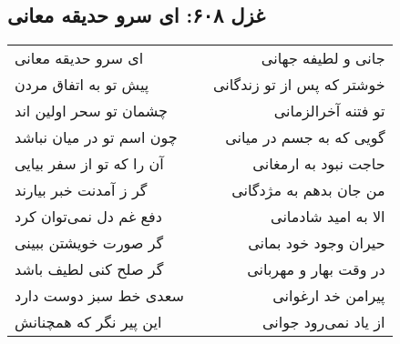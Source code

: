 \begin{center}
\section*{غزل ۶۰۸: ای سرو حدیقه معانی}
\label{sec:608}
\begin{longtable}{l p{0.5cm} r}
ای سرو حدیقه معانی
&&
جانی و لطیفه جهانی
\\
پیش تو به اتفاق مردن
&&
خوشتر که پس از تو زندگانی
\\
چشمان تو سحر اولین اند
&&
تو فتنه آخرالزمانی
\\
چون اسم تو در میان نباشد
&&
گویی که به جسم در میانی
\\
آن را که تو از سفر بیایی
&&
حاجت نبود به ارمغانی
\\
گر ز آمدنت خبر بیارند
&&
من جان بدهم به مژدگانی
\\
دفع غم دل نمی‌توان کرد
&&
الا به امید شادمانی
\\
گر صورت خویشتن ببینی
&&
حیران وجود خود بمانی
\\
گر صلح کنی لطیف باشد
&&
در وقت بهار و مهربانی
\\
سعدی خط سبز دوست دارد
&&
پیرامن خد ارغوانی
\\
این پیر نگر که همچنانش
&&
از یاد نمی‌رود جوانی
\\
\end{longtable}
\end{center}
